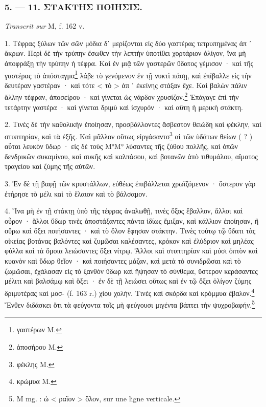 \documentclass[a4paper, 11pt, oneside, polutonikogreek, french]{article}
\begin{document}
\bigskip
\centerline{\EightStarTaper}
\centerline{\EightStarTaper\EightStarTaper}
\bigskip

\subsubsection{5. --- 11. ΣΤΑΚΤΗΣ ΠΟΙΗΣΙΣ.}

\emph{Transcrit sur} M, f. 162 v.

\bigskip

1. Τέφρας ξύλων τῶν σῶν μόδια δʹ μερίζονται εἰς δύο γαστέρας τετρυπημένας ἀπ ᾽ ἄκρων. Περὶ δὲ τὴν τρύπην ἔσωθεν τὴν λεπτὴν ὑποτίθει χορτάριον ὀλίγον, ἵνα μὴ ἀποφράξῃ τὴν τρύπην ἡ τέφρα. Καὶ ἐν μιᾷ τῶν γαστερῶν ὕδατος γέμισον · καὶ τῆς γαστέρας τὸ ἀπόσταγμα\footnote{γαστέρων M.} λάβε τὸ γενόμενον ἐν τῇ νυκτὶ πάσῃ, καὶ ἐπίβαλλε εἰς τὴν δευτέραν γαστέραν · καὶ τότε < τὸ > ἀπ ᾽ ἐκείνης στάξαν ἔχε. Καὶ βαλὼν πάλιν ἄλλην τέφραν, ἀποσείρου · καὶ γίνεται ὡς νάρδον χρυσίζον.\footnote{ἀποσήρου M.} Ἐπάγαγε ἐπὶ τὴν τετάρτην γαστέρα · καὶ γίνεται δριμὺ καὶ ἰσχυρόν · καὶ αὕτη ἡ μερικὴ στάκτη.

2. Τινὲς δὲ τὴν καθολικὴν ἐποίησαν, προσβάλλοντες ἄσβεστον θειώδη καὶ φέκλην, καὶ στυπτηρίαν, καὶ τὰ ἑξῆς. Καὶ μᾶλλον οὕτως εἰργάσαντο\footnote{φέκλης M.} αἱ τῶν ὑδάτων θείων ( ? ) αὗται λευκὸν ὕδωρ · εἰς δὲ τοὺς Μ°Μ° λύσαντες τῆς ζύθου πολλῆς, καὶ ὁπῶν δενδρικῶν συκαμίνου, καὶ συκῆς καὶ καλπάσου, καὶ βοτανῶν ἀπὸ τιθυμάλου, αἵματος τραγείου καὶ ζύμης τῆς αὐτῶν.

3. Ἐν δὲ τῇ βαφῇ τῶν κρυστάλλων, εὐθέως ἐπιβάλλεται χρωϊζόμενον · ὕστερον γὰρ ἐτήρησε τὸ μέλι καὶ τὸ ἔλαιον καὶ τὸ βάλσαμον.

4. Ἵνα μὴ ἐν τῇ στάκτῃ ὑπὸ τῆς τέφρας ἀναλωθῇ, τινὲς ὄξος ἔβαλλον, ἄλλοι καὶ οὖρον · ἄλλοι ὕδωρ τινὲς ἀποστάξαντες πάντα ἰδίως ἔμιξαν, καὶ κάλλιον ἐποίησαν, ἢ οὔρω καὶ ὄξει ποιήσαντες · καὶ τὸ ὅλον ἔφησαν στάκτην. Τινὲς τούτῳ τῷ ὕδατι τὰς οἰκείας βοτάνας βαλόντες καὶ ζυμῶσαι καλέσαντες, κρόκον καὶ ἐλύδριον καὶ μηλέας φύλλα καὶ τὰ ὅμοια λειώσαντες ὄξει νίτρῳ. Ἄλλοι καὶ στυπτηρίαν καὶ μύσι ὀπτὸν καὶ κυανὸν καὶ ὕδωρ θεῖον · καὶ ποιήσαντες μάζαν, καὶ μετἀ τὸ συνιδρῶσαι καὶ τὸ ζωμῶσαι, ἐχάλασαν εἰς τὸ ξανθὸν ὕδωρ καὶ ἥψησαν τὸ σύνθεμα, ὕστερον κεράσαντες μέλιτι καὶ βαλσάμῳ καὶ ὄξει · ἐν δὲ τῇ λειώσει οὕτως καὶ ἐν τῷ ὄξει ὀλίγον ζύμης δριμυτέρας καὶ μοσ- (f. 163 r.) χίου χολήν. Τινὲς καὶ σκόρδα καὶ κρόμμυα ἔβαλον.\footnote{κρώμυα M.} Ἔνθεν διδάσκει ὅτι τὰ φεύγοντα τοῖς μὴ φεύγουσι μιγέντα βάπτει τὴν ψυχροβαφήν.\footnote{M mg. : ὡ < ραῖον > ὅλον, sur une ligne verticale.}
\end{document}

